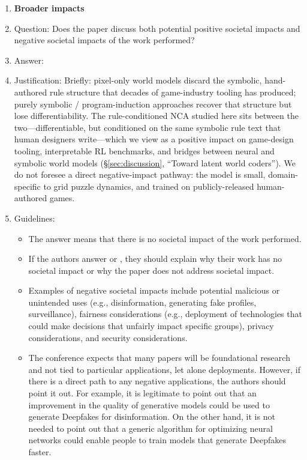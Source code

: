 \begin{enumerate}
\item {\bf Broader impacts}
    \item[] Question: Does the paper discuss both potential positive societal impacts and negative societal impacts of the work performed?
    \item[] Answer: \answerYes{}
    \item[] Justification: Briefly: pixel-only world models discard the symbolic, hand-authored rule structure that decades of game-industry tooling has produced; purely symbolic / program-induction approaches recover that structure but lose differentiability. The rule-conditioned NCA studied here sits between the two---differentiable, but conditioned on the same symbolic rule text that human designers write---which we view as a positive impact on game-design tooling, interpretable RL benchmarks, and bridges between neural and symbolic world models (\S\ref{sec:discussion}, ``Toward latent world coders''). We do not foresee a direct negative-impact pathway: the model is small, domain-specific to grid puzzle dynamics, and trained on publicly-released human-authored games.
    \item[] Guidelines:
    \begin{itemize}
        \item The answer \answerNA{} means that there is no societal impact of the work performed.
        \item If the authors answer \answerNA{} or \answerNo, they should explain why their work has no societal impact or why the paper does not address societal impact.
        \item Examples of negative societal impacts include potential malicious or unintended uses (e.g., disinformation, generating fake profiles, surveillance), fairness considerations (e.g., deployment of technologies that could make decisions that unfairly impact specific groups), privacy considerations, and security considerations.
        \item The conference expects that many papers will be foundational research and not tied to particular applications, let alone deployments. However, if there is a direct path to any negative applications, the authors should point it out. For example, it is legitimate to point out that an improvement in the quality of generative models could be used to generate Deepfakes for disinformation. On the other hand, it is not needed to point out that a generic algorithm for optimizing neural networks could enable people to train models that generate Deepfakes faster.

\end{itemize}
\end{enumerate}
